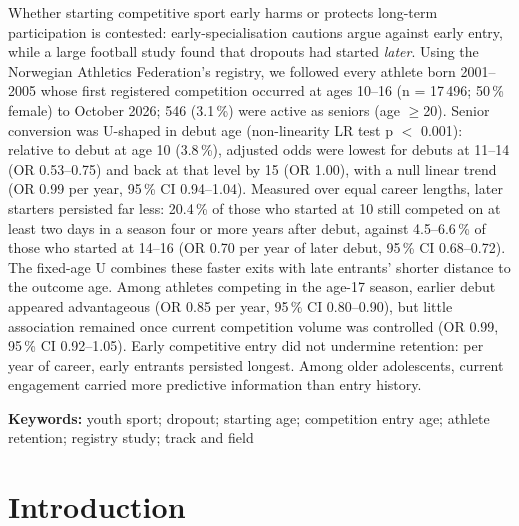 \documentclass[12pt,a4paper]{article}
\begin{document}
\noindent Whether starting competitive sport early harms or protects long-term participation is contested: early-specialisation cautions argue against early entry, while a large football study found that dropouts had started \emph{later}. Using the Norwegian Athletics Federation's registry, we followed every athlete born 2001--2005 whose first registered competition occurred at ages 10--16 (n = 17\,496; 50\,\% female) to October 2026; 546 (3.1\,\%) were active as seniors (age $\geq$20). Senior conversion was U-shaped in debut age (non-linearity LR test p $<$ 0.001): relative to debut at age 10 (3.8\,\%), adjusted odds were lowest for debuts at 11--14 (OR 0.53--0.75) and back at that level by 15 (OR 1.00), with a null linear trend (OR 0.99 per year, 95\,\% CI 0.94--1.04). Measured over equal career lengths, later starters persisted far less: 20.4\,\% of those who started at 10 still competed on at least two days in a season four or more years after debut, against 4.5--6.6\,\% of those who started at 14--16 (OR 0.70 per year of later debut, 95\,\% CI 0.68--0.72). The fixed-age U combines these faster exits with late entrants' shorter distance to the outcome age. Among athletes competing in the age-17 season, earlier debut appeared advantageous (OR 0.85 per year, 95\,\% CI 0.80--0.90), but little association remained once current competition volume was controlled (OR 0.99, 95\,\% CI 0.92--1.05). Early competitive entry did not undermine retention: per year of career, early entrants persisted longest. Among older adolescents, current engagement carried more predictive information than entry history.

\vspace{0.5em}
\noindent\textbf{Keywords:} youth sport; dropout; starting age; competition entry age; athlete retention; registry study; track and field

\newpage

\section{Introduction}
\end{document}
